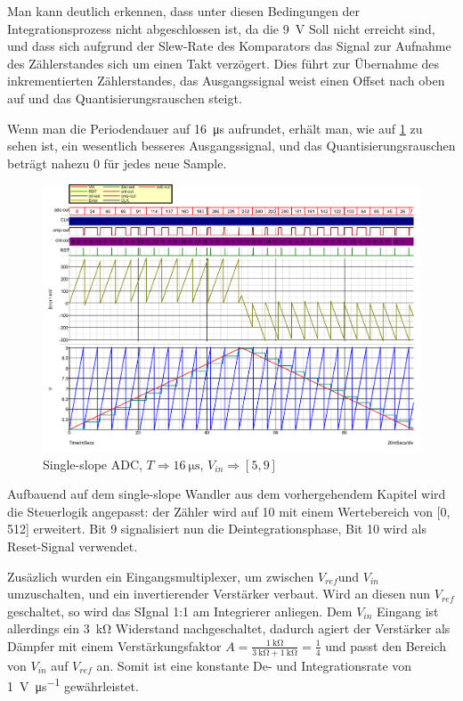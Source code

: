 \documentclass[
	ngerman,
	parskip=half,
	twocolumn,
	DIV=calc,
	]{scrartcl}
\begin{document}
		Man kann deutlich erkennen, dass unter diesen Bedingungen der Integrationsprozess nicht abgeschlossen ist, da die \SI{9}{\volt} Soll nicht erreicht sind, und dass sich aufgrund der Slew-Rate des Komparators das Signal zur Aufnahme des Zählerstandes sich um einen Takt verzögert. Dies führt zur Übernahme des inkrementierten Zählerstandes, das Ausgangssignal weist einen Offset nach oben auf und das Quantisierungsrauschen steigt.
		
		Wenn man die Periodendauer auf \SI{16}{\micro\second} aufrundet, erhält man, wie auf \cref{fig:single-slope-ideal} zu sehen ist, ein wesentlich besseres Ausgangssignal, und das Quantisierungsrauschen beträgt nahezu 0 für jedes neue Sample. 
		
		\begin{figure}[h!]
			\centering
			\includegraphics[width=\linewidth]{ideal_single_slope}
			\caption[Single-slope ADC (T = \SI{16}{\micro\second})]{Single-slope ADC, $T \Rightarrow \SI{16}{\micro\second}$, $V_{in} \Rightarrow [5,  9]$}
			\label{fig:single-slope-ideal}
		\end{figure}
		
		
		\label{sec:dual-slope-adc}
		
		Aufbauend auf dem single-slope Wandler aus dem vorhergehendem Kapitel wird die Steuerlogik angepasst: der Zähler wird auf \SI{10}{\bit} mit einem Wertebereich von [0, 512] erweitert. Bit 9 signalisiert nun die Deintegrationsphase, Bit 10 wird als Reset-Signal verwendet.
				
		Zusäzlich wurden ein Eingangsmultiplexer, um zwischen $V_{ref} $und $V_{in} $ umzuschalten, und ein invertierender Verstärker verbaut.
		Wird an diesen nun $V_{ref} $ geschaltet, so wird das SIgnal 1:1 am Integrierer anliegen. Dem $V_{in}$ Eingang ist allerdings ein \SI{3}{\kilo\ohm} Widerstand nachgeschaltet, dadurch agiert der Verstärker als Dämpfer mit einem Verstärkungsfaktor $ A = \frac{\SI{1}{\kilo\ohm}}{\SI{3}{\kilo\ohm} + \SI{1}{\kilo\ohm}} = \frac{1}{4}$ und passt den Bereich von $V_{in} $ auf $V_{ref} $ an. Somit ist eine konstante De- und Integrationsrate von \SI{1}{\volt\per\micro\second} gewährleistet.
		
\end{document}
